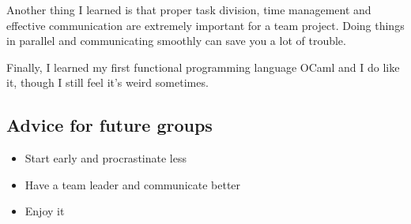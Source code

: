 Another thing I learned is that proper task division, time management and effective communication are extremely important for a team project. Doing things in parallel and communicating smoothly can save you a lot of trouble.

Finally, I learned my first functional programming language OCaml and I do like it, though I still feel it's weird sometimes.

\subsection{Advice for future groups}
\begin{itemize}
  \item Start early and procrastinate less
  \item Have a team leader and communicate better
  \item Enjoy it
\end{itemize}
